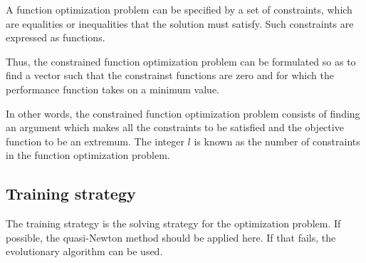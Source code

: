 A function optimization problem can be specified by a set of
constraints, which are equalities or inequalities that the solution
must satisfy. Such constraints are expressed as functions. 

Thus, the
constrained function optimization problem can be formulated so as to find a vector 
 such that the constrainst functions are zero 
and for which the performance function takes on a minimum value.

In other words, the constrained function optimization problem
consists of finding an argument which makes all the constraints to
be satisfied and the objective function to be an extremum. The
integer $l$ is known as the number of constraints in the function
optimization problem.

\subsection*{Training strategy}

The training strategy is the solving strategy
 for the optimization problem. 
If possible, the quasi-Newton method should be applied here. 
If that fails, the evolutionary algorithm can be used. 

